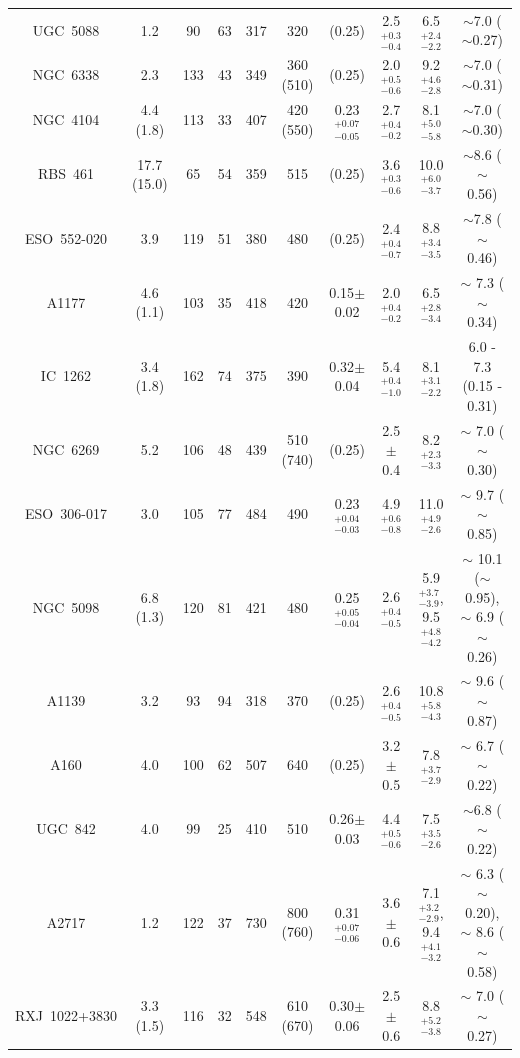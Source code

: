 \documentclass{aastex}
\begin{document}
\begin{table}
\begin{center}
{\begin{tabular}{cccccccccc}
UGC~5088 & 1.2 & 90 & 63 & 317 & 320 & (0.25) & 2.5$^{+0.3}_{-0.4}$  & 6.5$^{+2.4}_{-2.2}$ & $\sim$7.0 ($\sim$0.27) \\
NGC~6338 & 2.3 & 133 & 43 & 349 & 360 (510) & (0.25) & 2.0$^{+0.5}_{-0.6}$ & 9.2$^{+4.6}_{-2.8}$ & $\sim$7.0 ($\sim$0.31) \\
NGC~4104 & 4.4 (1.8) & 113 & 33 & 407 & 420 (550) & 0.23$^{+0.07}_{-0.05}$ & 2.7$^{+0.4}_{-0.2}$ & 8.1$^{+5.0}_{-5.8}$ & $\sim$7.0 ($\sim$0.30) \\
RBS~461  & 17.7 (15.0) & 65 & 54 & 359 & 515 & (0.25) & 3.6$^{+0.3}_{-0.6}$ & 10.0$^{+6.0}_{-3.7}$ & $\sim$8.6 ($\sim$ 0.56) \\
ESO~552-020 & 3.9 & 119 & 51 & 380 & 480 & (0.25) & 2.4$^{+0.4}_{-0.7}$ & 8.8$^{+3.4}_{-3.5}$ & $\sim$7.8 ($\sim$ 0.46) \\
A1177 & 4.6 (1.1) & 103 & 35 & 418 & 420 & 0.15$\pm$0.02\tablenotemark{j} & 2.0$^{+0.4}_{-0.2}$ & 6.5$^{+2.8}_{-3.4}$ & $\sim$ 7.3 ($\sim$ 0.34) \\
IC~1262  & 3.4 (1.8) & 162 & 74 & 375 & 390 & 0.32$\pm$0.04 & 5.4$^{+0.4}_{-1.0}$ & 8.1$^{+3.1}_{-2.2}$ & 6.0 - 7.3 (0.15 - 0.31) \\
NGC~6269 & 5.2 & 106 & 48 & 439 & 510 (740) & (0.25) & 2.5$\pm$0.4 & 8.2$^{+2.3}_{-3.3}$ & $\sim$ 7.0 ($\sim$ 0.30) \\
ESO~306-017 & 3.0 & 105 & 77 & 484 & 490 & 0.23$^{+0.04}_{-0.03}$ & 4.9$^{+0.6}_{-0.8}$ & 11.0$^{+4.9}_{-2.6}$ & $\sim$ 9.7 ($\sim$ 0.85) \\
NGC~5098 & 6.8 (1.3) & 120 & 81 & 421 & 480 & 0.25$^{+0.05}_{-0.04}$ & 2.6$^{+0.4}_{-0.5}$ & 5.9$^{+3.7}_{-3.9}$, 9.5$^{+4.8}_{-4.2}$ & $\sim$ 10.1 ($\sim$ 0.95), $\sim$ 6.9 ($\sim$ 0.26) \\
A1139 & 3.2 & 93 & 94 & 318 & 370 & (0.25) & 2.6$^{+0.4}_{-0.5}$ & 10.8$^{+5.8}_{-4.3}$ & $\sim$ 9.6 ($\sim$ 0.87) \\
A160 & 4.0 & 100 & 62 & 507 & 640 & (0.25) & 3.2$\pm$0.5 & 7.8$^{+3.7}_{-2.9}$ & $\sim$ 6.7 ($\sim$ 0.22) \\
UGC~842 & 4.0 & 99 & 25 & 410 & 510 & 0.26$\pm$0.03 & 4.4$^{+0.5}_{-0.6}$ & 7.5$^{+3.5}_{-2.6}$ & $\sim$6.8 ($\sim$ 0.22)\\
A2717 & 1.2 & 122 & 37 & 730 & 800 (760) & 0.31$^{+0.07}_{-0.06}$ & 3.6$\pm$0.6 & 7.1$^{+3.2}_{-2.9}$, 9.4$^{+4.1}_{-3.2}$ & $\sim$ 6.3 ($\sim$ 0.20), $\sim$ 8.6 ($\sim$ 0.58) \\
RXJ~1022+3830 & 3.3 (1.5) & 116 & 32 & 548 & 610 (670) & 0.30$\pm$0.06 & 2.5$\pm$0.6 & 8.8$^{+5.2}_{-3.8}$ & $\sim$ 7.0 ($\sim$ 0.27)\\

\end{tabular}}
\end{center}
\end{table}
\end{document}
